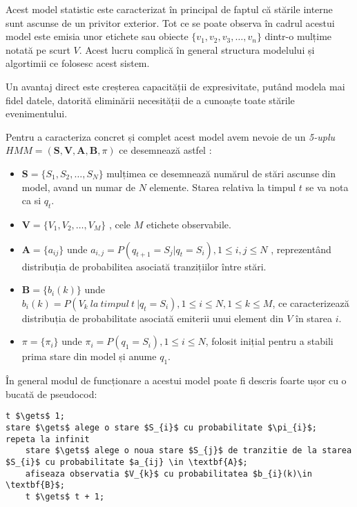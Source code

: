 Acest model statistic este caracterizat în principal de faptul că stările interne sunt ascunse de un privitor exterior. Tot ce se poate observa în cadrul acestui model este emisia unor etichete sau obiecte 
$\{v_{1},v_{2},v_{3},\dots,v_{n}\}$ dintr-o mulțime notată pe scurt $V$. Acest lucru complică în general structura modelului și algortimii ce folosesc acest sistem. \par

Un avantaj direct este creșterea capacității de expresivitate, putând modela mai fidel datele, datorită eliminării necesității de a cunoaște toate stările evenimentului.\par

Pentru a caracteriza concret și complet acest model avem nevoie de un \textit{5-uplu} $ HMM = (\textbf{S},\textbf{V},\textbf{A},\textbf{B},\pi)$ ce desemnează astfel : \par
\begin{itemize}
\item{$\textbf{S} = \{S_{1},S_{2},\dots,S_{N}\}$ mulțimea ce desemnează numărul de stări ascunse din model, avand un numar de $N$ elemente. Starea relativa la timpul $t$ se va nota ca si $q_{t}$.}
\item{$\textbf{V} = \{V_{1},V_{2},\dots,V_{M}\}$ , cele $M$ etichete observabile.}
\item{$\textbf{A} = \{a_{ij}\}$ unde $a_{i,j} = P(q_{t+1} = S_{j} | q_{t} = S_{i}) , 1 \leq i , j \leq N$ , reprezentând distribuția de probabilitea asociată tranzițiilor între stări.}
\item{$\textbf{B} = \{b_{i}(k)\}$ unde $b_{i}(k) = P(V_{k}\ la\ timpul\ t\ | q_{t} = S_{i}), 1 \leq i \leq N , 1 \leq k \leq M$, ce caracterizează distribuția de probabilitate asociată emiterii unui element din $V$ în starea $i$.}
\item{$\pi = \{\pi_{i}\}$ unde $\pi_{i} = P(q_{1} = S_{i}) , 1 \leq i \leq N$, folosit inițial pentru a stabili prima stare din model și anume $q_{1}$.}
\end{itemize}
\par

În general modul de funcționare a acestui model poate fi descris foarte ușor cu o bucată de pseudocod:

\begin{lstlisting}[mathescape=true]
t $\gets$ 1;
stare $\gets$ alege o stare $S_{i}$ cu probabilitate $\pi_{i}$;
repeta la infinit
	stare $\gets$ alege o noua stare $S_{j}$ de tranzitie de la starea $S_{i}$ cu probabilitate $a_{ij} \in \textbf{A}$;
	afiseaza observatia $V_{k}$ cu probabilitatea $b_{i}(k)\in \textbf{B}$;
	t $\gets$ t + 1;
\end{lstlisting}

